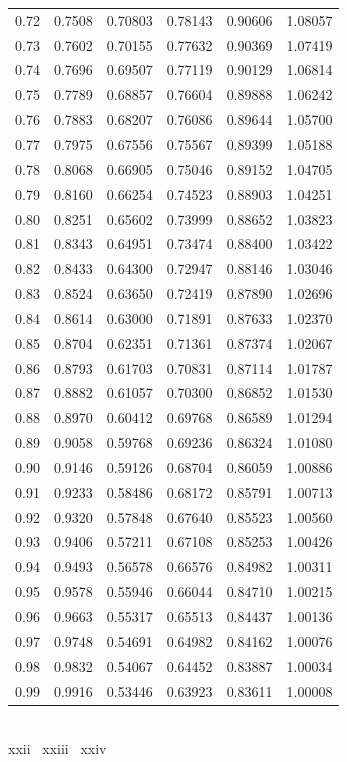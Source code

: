 \begin{minipage}{0.48\textwidth}
\begin{tabular}{c|c|c|c|c|c}
        0.72 & 0.7508 & 0.70803 & 0.78143 & 0.90606 & 1.08057 \\
        0.73 & 0.7602 & 0.70155 & 0.77632 & 0.90369 & 1.07419 \\
        0.74 & 0.7696 & 0.69507 & 0.77119 & 0.90129 & 1.06814 \\
        0.75 & 0.7789 & 0.68857 & 0.76604 & 0.89888 & 1.06242 \\
        0.76 & 0.7883 & 0.68207 & 0.76086 & 0.89644 & 1.05700 \\
        0.77 & 0.7975 & 0.67556 & 0.75567 & 0.89399 & 1.05188 \\
        0.78 & 0.8068 & 0.66905 & 0.75046 & 0.89152 & 1.04705 \\
        0.79 & 0.8160 & 0.66254 & 0.74523 & 0.88903 & 1.04251 \\
        0.80 & 0.8251 & 0.65602 & 0.73999 & 0.88652 & 1.03823 \\
        0.81 & 0.8343 & 0.64951 & 0.73474 & 0.88400 & 1.03422 \\
        0.82 & 0.8433 & 0.64300 & 0.72947 & 0.88146 & 1.03046 \\
        0.83 & 0.8524 & 0.63650 & 0.72419 & 0.87890 & 1.02696 \\
        0.84 & 0.8614 & 0.63000 & 0.71891 & 0.87633 & 1.02370 \\
        0.85 & 0.8704 & 0.62351 & 0.71361 & 0.87374 & 1.02067 \\
        0.86 & 0.8793 & 0.61703 & 0.70831 & 0.87114 & 1.01787 \\
        0.87 & 0.8882 & 0.61057 & 0.70300 & 0.86852 & 1.01530 \\
        0.88 & 0.8970 & 0.60412 & 0.69768 & 0.86589 & 1.01294 \\
        0.89 & 0.9058 & 0.59768 & 0.69236 & 0.86324 & 1.01080 \\
        0.90 & 0.9146 & 0.59126 & 0.68704 & 0.86059 & 1.00886 \\
        0.91 & 0.9233 & 0.58486 & 0.68172 & 0.85791 & 1.00713 \\
        0.92 & 0.9320 & 0.57848 & 0.67640 & 0.85523 & 1.00560 \\
        0.93 & 0.9406 & 0.57211 & 0.67108 & 0.85253 & 1.00426 \\
        0.94 & 0.9493 & 0.56578 & 0.66576 & 0.84982 & 1.00311 \\
        0.95 & 0.9578 & 0.55946 & 0.66044 & 0.84710 & 1.00215 \\
        0.96 & 0.9663 & 0.55317 & 0.65513 & 0.84437 & 1.00136 \\
        0.97 & 0.9748 & 0.54691 & 0.64982 & 0.84162 & 1.00076 \\
        0.98 & 0.9832 & 0.54067 & 0.64452 & 0.83887 & 1.00034 \\
        0.99 & 0.9916 & 0.53446 & 0.63923 & 0.83611 & 1.00008 \\
    \end{tabular}
\end{minipage} \\ \vspace{4mm}
{\color{Blue}xxii} \textbar\ {\color{Red}xxiii} \textbar\ {\color{Green}xxiv}

